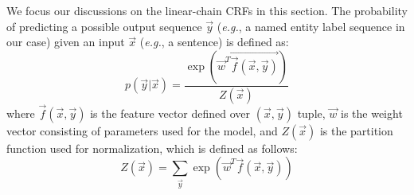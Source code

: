 We focus our discussions on the linear-chain CRFs in this section.
The probability of predicting a possible output sequence $\vec{y}$ ({\em e.g.}, a named entity label sequence in our case) given an input $\vec{x}$ ({\em e.g.}, a sentence) is defined as:
\begin{equation}
p(\vec{y}|\vec{x}) = \frac{\exp(\vec{\vec{w}^{T}\vec{f}(\vec{x},\vec{y}) })}{Z(\vec{x})}
\end{equation}
where $\vec{f}(\vec{x},\vec{y})$ is the feature vector defined over $(\vec{x},\vec{y})$ tuple, $\vec{w}$ is the weight vector consisting of parameters used for the model, and $Z(\vec{x})$ is the partition function used for normalization, which is defined as follows:
\begin{equation}
Z(\vec{x}) = \sum_{\vec{y}}
\exp
(\vec{w}^{T}\vec{f}(\vec{x}, \vec{y}))
\end{equation}

